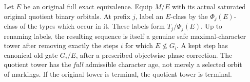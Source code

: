 \begin{theorem}
\label{thm:ep-quotient-tower}
Let \(E\) be an original full exact equivalence.
Equip \(M/E\) with its actual saturated original quotient
binary orbitals. At prefix \(j\), label an \(E\)-class
by the \(\Phi_j(E)\)-class of the types which occur in it.
These labels form \(T_j/\Phi_j(E)\).
Up to renaming labels, the resulting sequence is itself a
genuine safe maximal-character tower after removing exactly
the steps \(i\) for which \(E\not\le G_i\). A kept step has
canonical old gate \(G_i/E\), after a prescribed
objectwise phase correction. The quotient tower has the
\emph{full} admissible character age, not merely a selected
orbit of markings. If the original tower is terminal,
the quotient tower is terminal.
\end{theorem}
